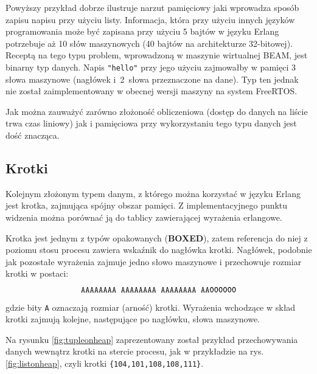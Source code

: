 Powyższy przykład dobrze ilustruje narzut pamięciowy jaki wprowadza sposób zapisu napisu przy użyciu listy. 
Informacja, która przy użyciu innych języków programowania może być zapisana przy użyciu 5 bajtów w języku Erlang potrzebuje aż 10 słów maszynowych (40 bajtów na architekturze 32-bitowej).
Receptą na tego typu problem, wprowadzoną w maszynie wirtualnej BEAM, jest binarny typ danych. Napis \texttt{"hello"} przy jego użyciu zajmowałby w pamięci 3 słowa maszynowe (nagłówek i~2~słowa przeznaczone na dane).
Typ ten jednak nie został zaimplementowany w obecnej wersji maszyny na system FreeRTOS.  

Jak można zauważyć zarówno złożoność obliczeniowa (dostęp do danych na liście trwa czas liniowy) jak i pamięciowa przy wykorzystaniu tego typu danych jest dość znacząca.

\subsection{Krotki}
\label{sub:typyKrotki}

Kolejnym złożonym typem danym, z którego można korzystać w języku Erlang jest krotka, zajmująca spójny obszar pamięci. Z implementacyjnego punktu widzenia można porównać ją do tablicy zawierającej wyrażenia erlangowe.

Krotka jest jednym z typów opakowanych (\textbf{BOXED}), zatem referencja do niej z poziomu stosu procesu zawiera wskaźnik do nagłówka krotki. Nagłówek, podobnie jak pozostałe wyrażenia zajmuje jedno słowo maszynowe i przechowuje rozmiar krotki w postaci:
$$\texttt{AAAAAAAA AAAAAAAA AAAAAAAA AA\textbf{000000}}$$
gdzie bity \texttt{A} oznaczają rozmiar (arność) krotki. Wyrażenia wchodzące w skład krotki zajmują kolejne, następujące po nagłówku, słowa maszynowe.

Na rysunku \ref{fig:tupleonheap} zaprezentowany został przykład przechowywania danych wewnątrz krotki na stercie procesu, jak w przykładzie na rys. \ref{fig:listonheap}, czyli krotki \texttt{\{104,101,108,108,111\}}.

